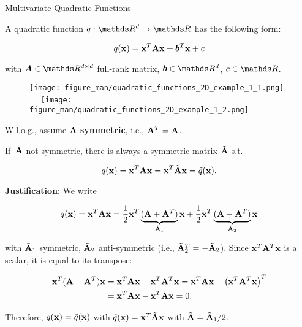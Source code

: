 \documentclass[11pt,compress,t,notes=noshow, xcolor=table]{beamer}
\begin{document}
\begin{vbframe}{Multivariate Quadratic Functions}

A quadratic function $q: \R^d \to \R$ has the following form: 

\begin{equation*}
    q(\mathbf{x}) = \mathbf{x}^T \mathbf{A} \mathbf{x} + \bm{b}^T \mathbf{x} + c
\end{equation*}

with $\bm{A} \in \R^{d \times d}$ full-rank matrix, $\bm{b} \in \R^d$, $c \in \R$. %

\vspace{0.5\baselineskip}

\begin{figure}
    \texttt{[image: figure\_man/quadratic\_functions\_2D\_example\_1\_1.png]} ~~ \texttt{[image: figure\_man/quadratic\_functions\_2D\_example\_1\_2.png]} \\
\end{figure}

\framebreak

W.l.o.g., assume $\mathbf{A}$ \textbf{symmetric}, i.e., $\mathbf{A}^T = \mathbf{A}$.

\vspace{0.5\baselineskip}

If~$\mathbf{A}$ not symmetric, there is always a symmetric matrix $\tilde {\mathbf{A}}$ s.t. 

\vspace*{-0.5\baselineskip}

\begin{equation*}
    q(\mathbf{x}) = \mathbf{x}^T \mathbf{A} \mathbf{x} = \mathbf{x}^T \tilde {\mathbf{A}} \mathbf{x} = \tilde q(\mathbf{x}).
\end{equation*}

\textbf{Justification}: We write

\begin{equation*}
    q(\mathbf{x}) = \mathbf{x}^T \mathbf{A} \mathbf{x} = \frac{1}{2} \mathbf{x}^T \underbrace{(\mathbf{A} + \mathbf{A}^T)}_{\tilde {\mathbf{A}}_1} \mathbf{x} + \frac{1}{2} \mathbf{x}^T \underbrace{(\mathbf{A} - \mathbf{A}^T)}_{\tilde {\mathbf{A}}_2} \mathbf{x}
\end{equation*}

with $\tilde {\mathbf{A}}_1$ symmetric, $\tilde {\mathbf{A}}_2$ anti-symmetric (i.e., $\tilde {\mathbf{A}}_2^T = - \tilde {\mathbf{A}}_2$). Since $\mathbf{x}^T \mathbf{A}^T \mathbf{x}$ is a scalar, it is equal to its transpose: 

\vspace*{-1.25\baselineskip}

\begin{align*}
    \mathbf{x}^T (\mathbf{A} - \mathbf{A}^T) \mathbf{x} &=  \mathbf{x}^T \mathbf{A} \mathbf{x} - \mathbf{x}^T \mathbf{A}^T \mathbf{x} =  \mathbf{x}^T \mathbf{A} \mathbf{x} - \left(\mathbf{x}^T \mathbf{A}^T \mathbf{x}\right)^T \\
    &= \mathbf{x}^T \mathbf{A} \mathbf{x} - \mathbf{x}^T \mathbf{A} \mathbf{x}  = 0.
\end{align*}

Therefore, $q(\mathbf{x}) = \tilde q(\mathbf{x})$ with $\tilde q(\mathbf{x}) = \mathbf{x}^T \tilde {\mathbf{A}} \mathbf{x}$ with $\tilde {\mathbf{A}} = \tilde {\mathbf{A}}_1/2$. 

\end{vbframe}
\end{document}
